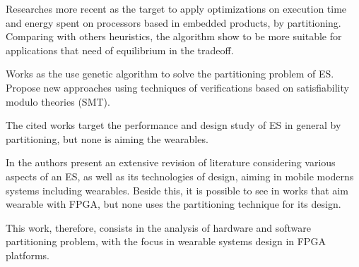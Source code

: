     
    Researches more recent as the \cite{BenHajHassine2017} target to apply optimizations on execution time and energy spent on processors based in embedded products, by partitioning.
    Comparing with others heuristics, the algorithm show to be more suitable for applications that need of equilibrium in the tradeoff.
    
    Works as the \cite{Trindade2016} use genetic algorithm to solve the partitioning problem of ES.
    Propose new approaches using techniques of verifications based on satisfiability modulo theories (SMT). 
    
    
    The cited works target the performance and design study of ES in general by partitioning, but none is aiming the wearables.
    
    
    In \cite{Jozwiak2017} the authors present an extensive revision of literature considering various aspects of an ES, as well as its technologies of design, aiming in mobile moderns systems including wearables.
    Beside this, it is possible to see in \cite{Plessl2003, Ahola2007, Abdelhedi2016, Narumi2016, Lee2015} works that aim wearable with FPGA, but none uses the partitioning technique for its design.
    
    
    This work, therefore, consists in the analysis of hardware and software partitioning problem, with the focus in wearable systems design in FPGA platforms.
